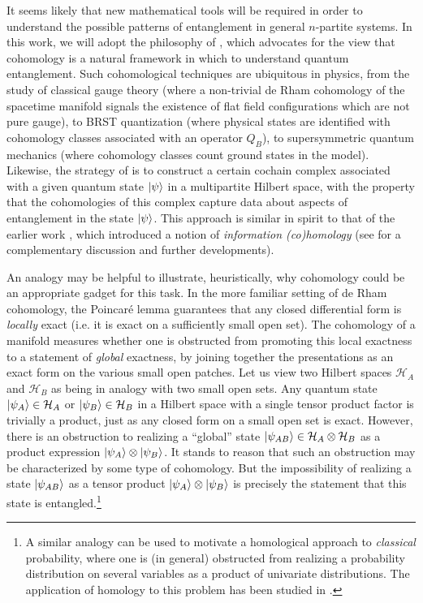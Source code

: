 \documentclass[12pt]{article}
\numberwithin{equation}{section}
\begin{document}
It seems likely that new mathematical tools will be required in order to understand the possible patterns of entanglement in general $n$-partite systems. In this work, we will adopt the philosophy of \cite{Mainiero:2019enr}, which advocates for the view that cohomology is a natural framework in which to understand quantum entanglement. Such cohomological techniques are ubiquitous in physics, from the study of classical gauge theory (where a non-trivial de Rham cohomology of the spacetime manifold signals the existence of flat field configurations which are not pure gauge), to BRST quantization (where physical states are identified with cohomology classes associated with an operator $Q_B$), to supersymmetric quantum mechanics (where cohomology classes count ground states in the model). Likewise, the strategy of \cite{Mainiero:2019enr} is to construct a certain cochain complex associated with a given quantum state $\ket{\psi}$ in a multipartite Hilbert space, with the property that the cohomologies of this complex capture data about aspects of entanglement in the state $\ket{\psi}$. This approach is similar in spirit to that of the earlier work \cite{e17053253}, which introduced a notion of \emph{information (co)homology} (see \cite{Vigneaux2017InformationSA} for a complementary discussion and further developments).


An analogy may be helpful to illustrate, heuristically, why cohomology could be an appropriate gadget for this task. In the more familiar setting of de Rham cohomology, the Poincar\'e lemma guarantees that any closed differential form is \emph{locally} exact (i.e. it is exact on a sufficiently small open set). The cohomology of a manifold measures whether one is obstructed from promoting this local exactness to a statement of \emph{global} exactness, by joining together the presentations as an exact form on the various small open patches. Let us view two Hilbert spaces $\mathcal{H}_A$ and $\mathcal{H}_B$ as being in analogy with two small open sets. Any quantum state $\ket{\psi_A} \in \mathcal{H}_A$ or $\ket{\psi_B} \in \mathcal{H}_B$ in a Hilbert space with a single tensor product factor is trivially a product, just as any closed form on a small open set is exact. However, there is an obstruction to realizing a ``global'' state $\ket{\psi_{AB}} \in \mathcal{H}_A \otimes \mathcal{H}_B$ as a product expression $\ket{\psi_A} \otimes \ket{\psi_B}$. It stands to reason that such an obstruction may be characterized by some type of cohomology. But the impossibility of realizing a state $\ket{\psi_{AB}}$ as a tensor product $\ket{\psi_A} \otimes \ket{\psi_B}$ is precisely the statement that this state is entangled.\footnote{A similar analogy can be used to motivate a homological approach to \emph{classical} probability, where one is (in general) obstructed from realizing a probability distribution on several variables as a product of univariate distributions. The application of homology to this problem has been studied in \cite{10.1007/978-3-031-38271-0_25}.
}
\end{document}
